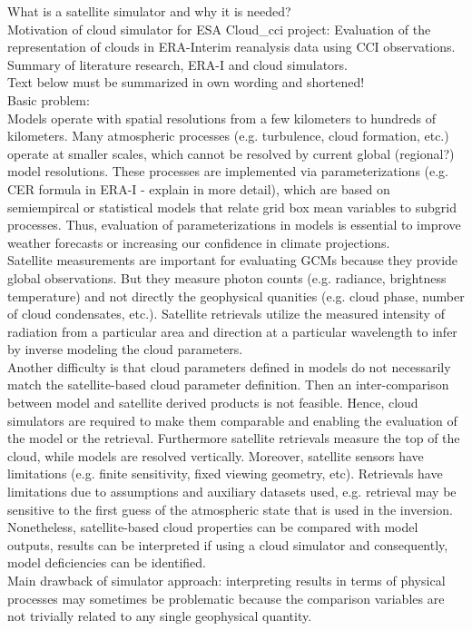 
What is a satellite simulator and why it is needed?\\
Motivation of cloud simulator for ESA Cloud\_cci project:
Evaluation of the representation of clouds in ERA-Interim reanalysis data using CCI observations.\\
Summary of literature research, ERA-I and cloud simulators.\\
Text below must be summarized in own wording and shortened!\\


\cite{Bodas2011} Basic problem:\\
Models operate with spatial resolutions from a few kilometers to hundreds of kilometers.
Many atmospheric processes (e.g. turbulence, cloud formation, etc.) operate at smaller scales, 
which cannot be resolved by current global (regional?) model resolutions.
These processes are implemented via parameterizations (e.g. CER formula in ERA-I - explain in more detail),
which are based on semiempircal or statistical models that relate grid box mean variables
to subgrid processes. Thus, evaluation of parameterizations in models is essential to improve
weather forecasts or increasing our confidence in climate projections.\\
Satellite measurements are important for evaluating GCMs because they provide global observations.
But they measure photon counts (e.g. radiance, brightness temperature) and not directly the geophysical quanities
(e.g. cloud phase, number of cloud condensates, etc.).
Satellite retrievals utilize the measured intensity of radiation from a particular area and direction 
at a particular wavelength to infer by inverse modeling the cloud parameters.\\
Another difficulty is that cloud parameters defined in models do not necessarily match the satellite-based
cloud parameter definition. Then an inter-comparison between model and satellite derived products is not feasible.
Hence, cloud simulators are required to make them comparable and enabling the evaluation of the model or the retrieval.
Furthermore satellite retrievals measure the top of the cloud, while models are resolved vertically.
Moreover, satellite sensors have limitations (e.g. finite sensitivity, fixed viewing geometry, etc).
Retrievals have limitations due to assumptions and auxiliary datasets used, e.g. retrieval may be sensitive to
the first guess of the atmospheric state that is used in the inversion.\\
Nonetheless, satellite-based cloud properties can be compared with model outputs, 
results can be interpreted if using a cloud simulator and consequently,
model deficiencies can be identified.\\
Main drawback of simulator approach: interpreting results in terms of physical processes may sometimes be
problematic because the comparison variables are not trivially related to any single geophysical quantity.\\

